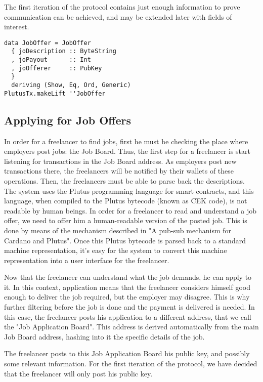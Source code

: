 \documentclass{article}
\begin{document}
The first iteration of the protocol contains just enough information to prove communication can be achieved, and may be extended later with fields of interest.

\begin{samepage}
\begin{verbatim}
data JobOffer = JobOffer
  { joDescription :: ByteString
  , joPayout      :: Int
  , joOfferer     :: PubKey
  }
  deriving (Show, Eq, Ord, Generic)
PlutusTx.makeLift ''JobOffer
\end{verbatim}
\end{samepage}

\subsection{Applying for Job Offers}

In order for a freelancer to find jobs, first he must be checking the place where employers post jobs: the Job Board. Thus, the first step for a freelancer is start listening for transactions in the Job Board address. As employers post new transactions there, the freelancers will be notified by their wallets of these operations. Then, the freelancers must be able to parse back the descriptions. The system uses the Plutus programming language for smart contracts, and this language, when compiled to the Plutus bytecode (known as CEK code), is not readable by human beings. In order for a freelancer to read and understand a job offer, we need to offer him a human-readable version of the posted job. This is done by means of the mechanism described in "A pub-sub mechanism for Cardano and Plutus"\cite{pub-sub-paper}. Once this Plutus bytecode is parsed back to a standard machine representation, it's easy for the system to convert this machine representation into a user interface for the freelancer.

Now that the freelancer can understand what the job demands, he can apply to it. In this context, application means that the freelancer considers himself good enough to deliver the job required, but the employer may disagree. This is why further filtering before the job is done and the payment is delivered is needed. In this case, the freelancer posts his application to a different address, that we call the "Job Application Board". This address is derived automatically from the main Job Board address, hashing into it the specific details of the job.

The freelancer posts to this Job Application Board his public key, and possibly some relevant information. For the first iteration of the protocol, we have decided that the freelancer will only post his public key.
\end{document}
